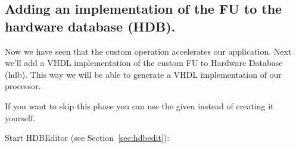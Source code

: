 \documentclass[twoside]{tceusermanual}
\begin{document}
\subsection{Adding an implementation of the FU to the hardware database
(HDB).}
\label{par:AddToHDB}

Now we have seen that the custom operation accelerates our application. Next
we'll add a VHDL implementation of the custom FU to Hardware Database (hdb).
This way we will be able to generate a VHDL implementation of our processor.

If you want to skip this phase you can use the given 
instead of creating it yourself.

Start HDBEditor (see Section~\ref{sec:hdbedit}):

\end{document}
